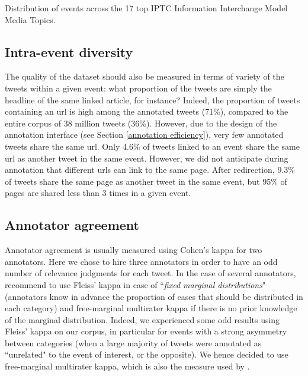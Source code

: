 \begin{table}
\begin{center}
\makebox[\textwidth][c]{}
\end{center}
\caption{Distribution of events across the 17 top IPTC Information Interchange Model Media Topics. \label{Tab:IPTC_cat}}
\end{table}

\subsection{Intra-event diversity}
The quality of the dataset should also be measured in
terms of variety of the tweets within a given event: what
proportion of the tweets are simply the headline of the
same linked article, for instance? Indeed, the proportion of
tweets containing an url is high among the annotated
tweets (71\%), compared to the entire corpus of 38 million
tweets (36\%). However, due to the design of the
annotation interface (see Section \ref{annotation efficiency}), very few
annotated tweets share the same url. Only 4.6\% of tweets
linked to an event share the same url as another tweet in
the same event.
However, we did not anticipate during annotation that
different urls can link to the same page. After redirection,
9.3\% of tweets share the same page as another tweet in
the same event, but 95\% of pages are shared less than 3
times in a given event.

	\subsection{Annotator agreement}

Annotator agreement is usually measured using Cohen's kappa for two annotators. Here we chose to hire three annotators in order to have an odd number of relevance judgments for each tweet. In the case of several annotators, \citet{randolph_free_2005} recommend to use Fleiss' kappa \citep{fleiss_measuring_1971} in case of ``\textit{fixed marginal distributions}" (annotators know in advance the proportion of cases that should be distributed in each category) and free-marginal multirater kappa \citep{randolph_free_2005} if there is no prior knowledge of the marginal distribution. Indeed, we experienced some odd results using Fleiss' kappa on our corpus, in particular for events with a strong asymmetry between categories (when a large majority of tweets were annotated as ``unrelated" to the event of interest, or the opposite). We hence decided to use free-marginal multirater kappa, which is also the measure used by \citet{mcminn_building_2013}.


